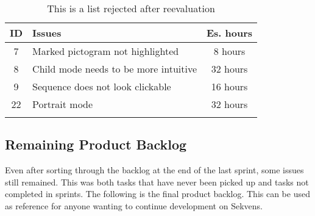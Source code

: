 \begin{longtable} { | c | p{12cm} | c | } 
\hline
	ID 	&	Issues	&	 Es. hours \\\hline
	7	& 	Marked pictogram not highlighted		& 	8 hours  \\\hline
	8	& 	Child mode needs to be more intuitive		& 	32 hours  \\\hline
	9	& 	Sequence does not look clickable 	& 	16 hours  \\\hline
	22	& 	Portrait mode	& 	32 hours  \\\hline
\caption{This is a list rejected after reevaluation}
\label{tab:spr4_sw_prodblog}
\end{longtable}


\subsection{Remaining Product Backlog}
Even after sorting through the backlog at the end of the last sprint, some issues still remained. This was both tasks that have never been picked up and tasks not completed in sprints. The following is the final product backlog. This can be used as reference for anyone wanting to continue development on Sekvens.

